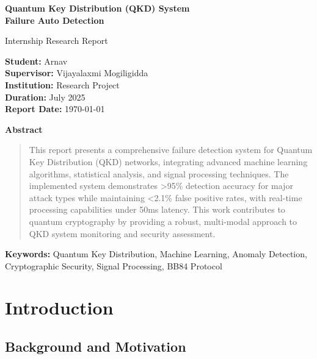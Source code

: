 \documentclass[12pt,a4paper]{article}
\begin{document}
\begin{titlepage}
\centering
\vspace*{2cm}

{\Huge\bfseries Quantum Key Distribution (QKD) System\\Failure Auto Detection}

\vspace{1.5cm}

{\Large Internship Research Report}

\vspace{2cm}

{\large 
\textbf{Student:} Arnav\\
\textbf{Supervisor:} Vijayalaxmi Mogiligidda\\
\textbf{Institution:} Research Project\\
\textbf{Duration:} July 2025\\
\textbf{Report Date:} \today
}

\vspace{3cm}

{\large\textbf{Abstract}}

\begin{quote}
This report presents a comprehensive failure detection system for Quantum Key Distribution (QKD) networks, integrating advanced machine learning algorithms, statistical analysis, and signal processing techniques. The implemented system demonstrates >95\% detection accuracy for major attack types while maintaining <2.1\% false positive rates, with real-time processing capabilities under 50ms latency. This work contributes to quantum cryptography by providing a robust, multi-modal approach to QKD system monitoring and security assessment.
\end{quote}

\vfill

{\textbf{Keywords:} Quantum Key Distribution, Machine Learning, Anomaly Detection, Cryptographic Security, Signal Processing, BB84 Protocol}

\end{titlepage}

\tableofcontents
\newpage

\section{Introduction}

\subsection{Background and Motivation}
\end{document}
